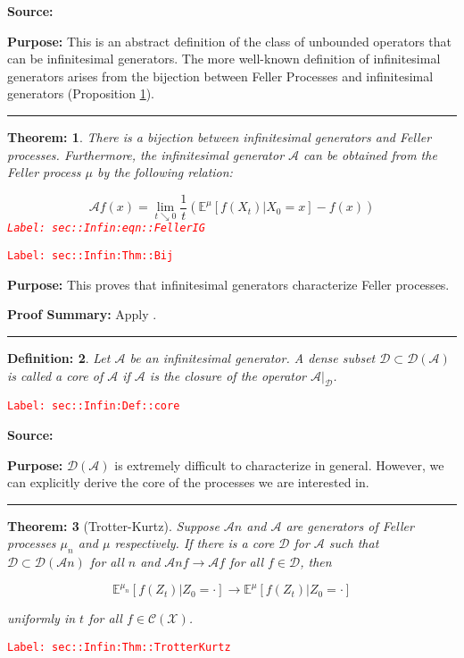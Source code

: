 \documentclass[12pt]{article}
\newcommand{\mb}{\mathbb}
\newcommand{\mc}{\mathcal}
\newcommand{\ra}{\rightarrow}
\newcommand{\tr}{\textcolor{red}}
\newcommand{\labe}[1]{\tr{\texttt{Label: #1}}}
\newcommand{\purpose}{\textbf{Purpose: }}
\newcommand{\pfsum}{\textbf{Proof Summary: }}
\newcommand{\lin}{\rule{\linewidth}{0.4 pt}}
\newcommand{\exmu}[2]{\mb{E}^{#1}\left[#2\right]}	%
\newcommand{\IG}{\mc{A}}						%
\newcommand{\core}{\mc{D}}							%
\newtheorem{thms}{Theorem: }[section]
\newtheorem{defn}[thms]{Definition: }
\begin{document}
\textbf{Source: }\cite[Definitions 2.1,2.7]{Lig85}

\purpose This is an abstract definition of the class of unbounded operators that can be infinitesimal generators. The more well-known definition of infinitesimal generators arises from the bijection between Feller Processes and infinitesimal generators (Proposition \ref{sec::Infin:Thm::Bij}).

\lin

\begin{thms}
There is a bijection between infinitesimal generators and Feller processes. Furthermore, the infinitesimal generator \(\IG{}\) can be obtained from the Feller process \(\mu\) by the following relation:

\begin{equation}
\mc{A}f(x) = \lim_{t\searrow 0} \frac{1}{t}\left(\mb{E}^\mu[f(X_t)|X_0=x] - f(x)\right)
\label{sec::Infin:eqn::FellerIG}
\end{equation}
\labe{sec::Infin:eqn::FellerIG}
\label{sec::Infin:Thm::Bij}
\end{thms}
\labe{sec::Infin:Thm::Bij}

\purpose This proves that infinitesimal generators characterize Feller processes.

\pfsum Apply \cite[Theorem 1.5,2.9]{Lig85}.

\lin

\begin{defn}
Let \(\IG{}\) be an infinitesimal generator. A dense subset \(\core\subset \core(\IG{})\) is called a core of \(\IG{}\) if \(\IG{}\) is the closure of the operator \(\IG{}|_\core\).
\label{sec::Infin:Def::core}
\end{defn}
\labe{sec::Infin:Def::core}

\textbf{Source: }\cite[Definition 2.11]{Lig85}

\purpose \(\core(\IG{})\) is extremely difficult to characterize in general. However, we can explicitly derive the core of the processes we are interested in.

\lin

\begin{thms}[Trotter-Kurtz]
Suppose \(\IG{n}\) and \(\IG{}\) are generators of Feller processes \(\mu_n\) and \(\mu\) respectively. If there is a core \(\core\) for \(\IG{}\) such that \(\core \subset \mc{D}(\IG{n})\) for all \(n\) and \(\IG{n} f \ra \IG{} f\) for all \(f \in \core\), then 

\[\exmu{\mu_n}{f(Z_t)|Z_0=\cdot} \ra \exmu{\mu}{f(Z_t)|Z_0=\cdot}\]

uniformly in \(t\) for all \(f \in \mc{C}(\mc{X})\).
\label{sec::Infin:Thm::TrotterKurtz}
\end{thms}
\labe{sec::Infin:Thm::TrotterKurtz}
\end{document}
